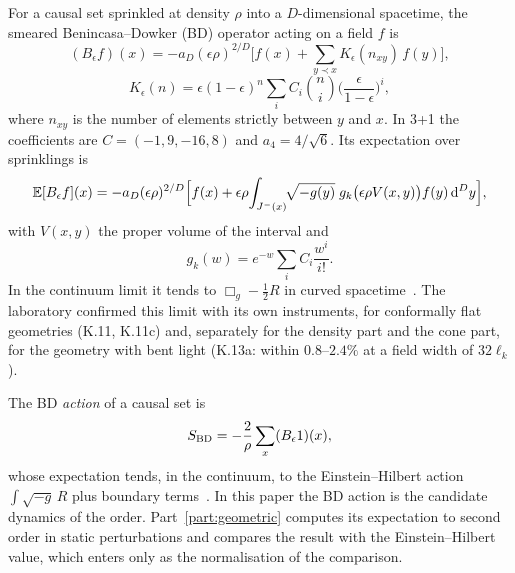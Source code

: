 For a causal set sprinkled at density $\rho$ into a $D$-dimensional spacetime, the smeared
Benincasa--Dowker (BD) operator acting on a field $f$ is~\cite{BenincasaDowker2010,Sorkin2007,DowkerGlaser2013}
\begin{equation}\label{eq:Bdiscrete}
  (B_\epsilon f)(x)=-a_D(\epsilon\rho)^{2/D}\Big[f(x)+\sum_{y\prec x}K_\epsilon(n_{xy})\,f(y)\Big],
\end{equation}
\begin{equation}
  K_\epsilon(n)=\epsilon(1-\epsilon)^n\sum_i C_i\binom{n}{i}\Big(\frac{\epsilon}{1-\epsilon}\Big)^{i},
\end{equation}
where $n_{xy}$ is the number of elements strictly between $y$ and $x$. In 3+1 the coefficients are
$C=(-1,9,-16,8)$ and $a_4=4/\sqrt6$. Its expectation over sprinklings is
\begin{equation}\label{eq:Bexpect}
  \mathbb{E}[B_\epsilon f](x)=-a_D(\epsilon\rho)^{2/D}\Big[f(x)+\epsilon\rho\!\int_{J^-(x)}\!\!\sqrt{-g(y)}\;
    g_k\big(\epsilon\rho V(x,y)\big)f(y)\,\mathrm{d}^Dy\Big],
\end{equation}
with $V(x,y)$ the proper volume of the interval and
\begin{equation}\label{eq:gk}
  g_k(w)=e^{-w}\sum_i C_i\frac{w^i}{i!}.
\end{equation}
In the continuum limit it tends to $\Box_g-\tfrac12R$ in curved
spacetime~\cite{BenincasaDowker2010,Belenchia2016}. The laboratory confirmed this limit with its own
instruments, for conformally flat geometries (K.11, K.11c) and, separately for the density part and
the cone part, for the geometry with bent light (K.13a: within $0.8$--$2.4\%$ at a field width of
$32\ell_k$).

The BD \emph{action} of a causal set is
\begin{equation}\label{eq:SBD}
  S_{\mathrm{BD}}=-\frac{2}{\rho}\sum_x (B_\epsilon 1)(x),
\end{equation}
whose expectation tends, in the continuum, to the Einstein--Hilbert action $\int\sqrt{-g}\,R$ plus
boundary terms~\cite{BuckDowkerJubbSurya2015}. In this paper the BD action is the candidate dynamics of the order. Part~\ref{part:geometric}
computes its expectation to second order in static perturbations and compares the result with the
Einstein--Hilbert value, which enters only as the normalisation of the comparison.
